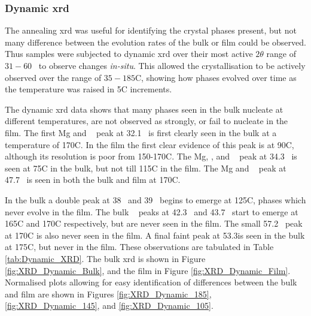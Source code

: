 \documentclass[a4paper,12pt,oneside]{article}%
\begin{document}

\subsubsection{Dynamic \acrshort{xrd}}

The annealing \acrshort{xrd} was useful for identifying the crystal phases present, but not many difference between the evolution rates of the bulk or film could be observed. Thus samples were subjected to dynamic \acrshort{xrd} over their most active $2 \theta$ range of $31-60$\degree~ to observe changes \textit{in-situ}. This allowed the crystallisation to be actively observed over the range of $35-185$\degree C, showing how phases evolved over time as the temperature was raised in 5\degree C increments. 

The dynamic \acrshort{xrd} data shows that many phases seen in the bulk nucleate at different temperatures, are not observed as strongly, or fail to nucleate in the film. The first Mg and \MgZn~ peak at 32.1\degree~ is first clearly seen in the bulk at a temperature of 170\degree C. In the film the first clear evidence of this peak is at 90\degree C, although its resolution is poor from 150-170\degree C. The Mg, \MgZn, and \CaMgZnFive~ peak at 34.3\degree~ is seen at 75\degree C in the bulk, but not till 115\degree C in the film. The Mg and \MgZn~ peak at 47.7\degree~ is seen in both the bulk and film at 170\degree C. 

In the bulk a double peak at 38\degree~ and 39\degree~ begins to emerge at 125\degree C, phases which never evolve in the film. The bulk \CaMgZnFive~ peaks at 42.3\degree~ and 43.7\degree~ start to emerge at 165\degree C and 170\degree C respectively, but are never seen in the film. The small 57.2\degree~ peak at 170\degree C is also never seen in the film. A final faint peak at 53.3\degree is seen in the bulk at 175\degree C, but never in the film. These observations are tabulated in Table \ref{tab:Dynamic_XRD}. The bulk \acrshort{xrd} is shown in Figure \ref{fig:XRD_Dynamic_Bulk}, and the film in Figure \ref{fig:XRD_Dynamic_Film}. Normalised plots allowing for easy identification of differences between the bulk and film are shown in Figures \ref{fig:XRD_Dynamic_185}, \ref{fig:XRD_Dynamic_145}, and \ref{fig:XRD_Dynamic_105}.
\end{document}
